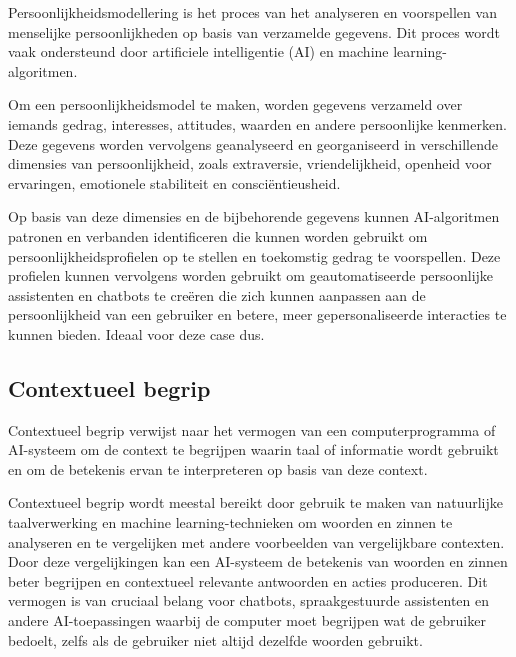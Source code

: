Persoonlijkheidsmodellering is het proces van het analyseren en voorspellen van menselijke persoonlijkheden op basis van verzamelde gegevens. Dit proces wordt vaak ondersteund door artificiele intelligentie (AI) en machine learning-algoritmen.

Om een persoonlijkheidsmodel te maken, worden gegevens verzameld over iemands gedrag, interesses, attitudes, waarden en andere persoonlijke kenmerken. Deze gegevens worden vervolgens geanalyseerd en georganiseerd in verschillende dimensies van persoonlijkheid, zoals extraversie, vriendelijkheid, openheid voor ervaringen, emotionele stabiliteit en consciëntieusheid.

Op basis van deze dimensies en de bijbehorende gegevens kunnen AI-algoritmen patronen en verbanden identificeren die kunnen worden gebruikt om persoonlijkheidsprofielen op te stellen en toekomstig gedrag te voorspellen. Deze profielen kunnen vervolgens worden gebruikt om geautomatiseerde persoonlijke assistenten en chatbots te creëren die zich kunnen aanpassen aan de persoonlijkheid van een gebruiker en betere, meer gepersonaliseerde interacties te kunnen bieden. Ideaal voor deze case dus.

\subsection{Contextueel begrip}

Contextueel begrip verwijst naar het vermogen van een computerprogramma of AI-systeem om de context te begrijpen waarin taal of informatie wordt gebruikt en om de betekenis ervan te interpreteren op basis van deze context.

Contextueel begrip wordt meestal bereikt door gebruik te maken van natuurlijke taalverwerking en machine learning-technieken om woorden en zinnen te analyseren en te vergelijken met andere voorbeelden van vergelijkbare contexten. Door deze vergelijkingen kan een AI-systeem de betekenis van woorden en zinnen beter begrijpen en contextueel relevante antwoorden en acties produceren. Dit vermogen is van cruciaal belang voor chatbots, spraakgestuurde assistenten en andere AI-toepassingen waarbij de computer moet begrijpen wat de gebruiker bedoelt, zelfs als de gebruiker niet altijd dezelfde woorden gebruikt.